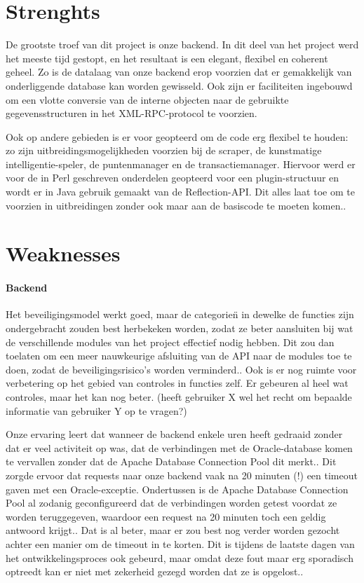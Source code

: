 \section{Strenghts}

De grootste troef van dit project is onze backend. In dit deel van het project werd het meeste tijd gestopt, en het resultaat is een elegant, flexibel en coherent geheel. 
Zo is de datalaag van onze backend erop voorzien dat er gemakkelijk van onderliggende database kan worden gewisseld. Ook zijn er faciliteiten ingebouwd om een vlotte conversie van de interne objecten naar de gebruikte gegevensstructuren in het XML-RPC-protocol te voorzien.

Ook op andere gebieden is er voor geopteerd om de code erg flexibel te houden: zo zijn uitbreidingsmogelijkheden voorzien bij de scraper, de kunstmatige intelligentie-speler, de puntenmanager en de transactiemanager. Hiervoor werd er voor de in Perl geschreven onderdelen geopteerd voor een plugin-structuur en wordt er in Java gebruik gemaakt van de Reflection-API. Dit alles laat toe om te voorzien in uitbreidingen zonder ook maar aan de basiscode te moeten komen..

\section{Weaknesses}

\paragraph{Backend} Het beveiligingsmodel werkt goed, maar de categorie\"n in dewelke de functies zijn ondergebracht zouden best herbekeken worden, zodat ze beter aansluiten bij wat de verschillende modules van het project effectief nodig hebben. Dit zou dan toelaten om een meer nauwkeurige afsluiting van de API naar de modules toe te doen, zodat de beveiligingsrisico's worden verminderd.. Ook is er nog ruimte voor verbetering op het gebied van controles in functies zelf. Er gebeuren al heel wat controles, maar het kan nog beter. (heeft gebruiker X wel het recht om bepaalde informatie van gebruiker Y op te vragen?)

Onze ervaring leert dat wanneer de backend enkele uren heeft gedraaid zonder dat er veel activiteit op was, dat de verbindingen met de Oracle-database komen te vervallen zonder dat de Apache Database Connection Pool dit merkt.. Dit zorgde ervoor dat requests naar onze backend vaak na 20 minuten (!) een timeout gaven met een Oracle-exceptie. Ondertussen is de Apache Database Connection Pool al zodanig geconfigureerd dat de verbindingen worden getest voordat ze worden teruggegeven, waardoor een request na 20 minuten toch een geldig antwoord krijgt.. Dat is al beter, maar er zou best nog verder worden gezocht achter een manier om de timeout in te korten. Dit is tijdens de laatste dagen van het ontwikkelingsproces ook gebeurd, maar omdat deze fout maar erg sporadisch optreedt kan er niet met zekerheid gezegd worden dat ze is opgelost..

